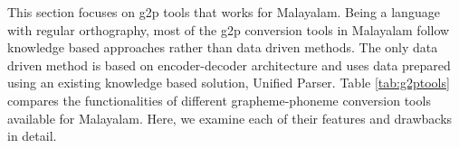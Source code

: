 


This section focuses on \gls{g2p} tools that works for Malayalam. Being a language with regular orthography, most of the \gls{g2p} conversion tools in
Malayalam follow knowledge based approaches
\cite{duddington2012espeak,baby2016unified,parlikar2016festvox,aksharamukha,kunchukuttan2020indicnlp,manghat2020malayalam,aswathy2014improving}
rather than data driven methods.
The only data driven method is based on encoder-decoder architecture \cite{Priyamvada_2021} and uses data prepared using an existing knowledge based
solution, Unified Parser. Table \ref{tab:g2ptools} compares the functionalities of different
grapheme-phoneme conversion tools available for Malayalam. Here, we examine
each of their features and drawbacks in detail.

